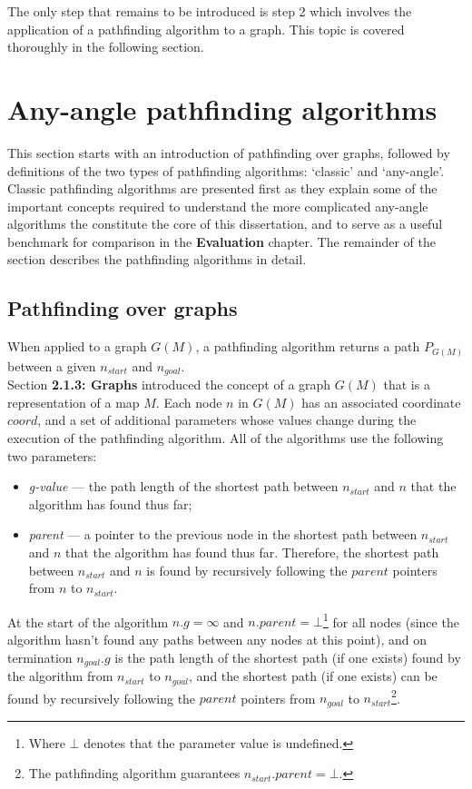 \documentclass[12pt,notitlepage]{report}
\begin{document}
\noindent
The only step that remains to be introduced is step 2 which involves the application of a pathfinding algorithm to a graph. This topic is covered thoroughly in the following section.

\section{Any-angle pathfinding algorithms}

\noindent
This section starts with an introduction of pathfinding over graphs, followed by definitions of the two types of pathfinding algorithms: `classic' and `any-angle'. Classic pathfinding algorithms are presented first as they explain some of the important concepts required to understand the more complicated any-angle algorithms the constitute the core of this dissertation, and to serve as a useful benchmark for comparison in the {\bfseries Evaluation} chapter. The remainder of the section describes the pathfinding algorithms in detail.
 
\subsection{Pathfinding over graphs}

When applied to a graph $G(M)$, a pathfinding algorithm returns a path $P_{G(M)}$ between a given $n_{start}$ and $n_{goal}$.\\

\noindent
Section {\bfseries 2.1.3: Graphs} introduced the concept of a graph $G(M)$ that is a representation of a map $M$. Each node $n$ in $G(M)$ has an associated coordinate $coord$, and a set of additional parameters whose values change during the execution of the pathfinding algorithm. All of the algorithms use the following two parameters:
\begin{itemize}
\item {\em g-value} --- the path length of the shortest path between $n_{start}$ and $n$ that the algorithm has found thus far;
\item {\em parent} --- a pointer to the previous node in the shortest path between $n_{start}$ and $n$ that the algorithm has found thus far. Therefore, the shortest path between $n_{start}$ and $n$ is found by recursively following the $parent$ pointers from $n$ to $n_{start}$.
\end{itemize}

\noindent
At the start of the algorithm $n.g = \infty$ and $n.parent = \bot$\footnote{Where $\bot$ denotes that the parameter value is undefined.} for all nodes (since the algorithm hasn't found any paths between any nodes at this point), and on termination $n_{goal}.g$ is the path length of the shortest path (if one exists) found by the algorithm from $n_{start}$ to $n_{goal}$, and the shortest path (if one exists) can be found by recursively following the $parent$ pointers from $n_{goal}$ to $n_{start}$\footnote{The pathfinding algorithm guarantees $n_{start}.parent = \bot$.}.
\end{document}
